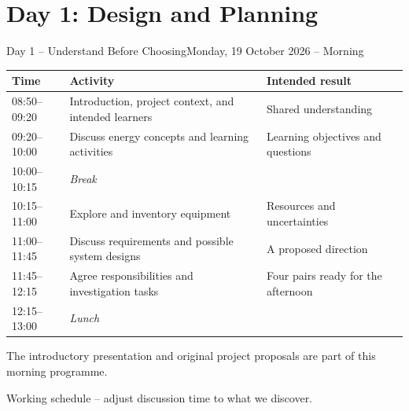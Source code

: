\section[nosectionpage]{Day 1: Design and Planning}
\begin{frame}{Day 1 -- Understand Before Choosing}{Monday, 19 October 2026 -- Morning}
\small\renewcommand{\arraystretch}{1.35}
\par\noindent\begin{tabularx}{\textwidth}{@{}l>{\raggedright\arraybackslash}X >{\raggedright\arraybackslash}p{}@{}}
\toprule
\textbf{Time} & \textbf{Activity} & \textbf{Intended result}\\\midrule
08:50--09:20 & Introduction, project context, and intended learners & Shared understanding\\
09:20--10:00 & Discuss energy concepts and learning activities & Learning objectives and questions\\
10:00--10:15 & \textit{Break} & \\
10:15--11:00 & Explore and inventory equipment & Resources and uncertainties\\
11:00--11:45 & Discuss requirements and possible system designs & A proposed direction\\
11:45--12:15 & Agree responsibilities and investigation tasks & Four pairs ready for the afternoon\\
12:15--13:00 & \textit{Lunch} & \\\bottomrule
\end{tabularx}\par
\vspace{.6em}
\footnotesize The introductory presentation and original project proposals are part of this morning programme.\par
\alert{Working schedule -- adjust discussion time to what we discover.}
\end{frame}

